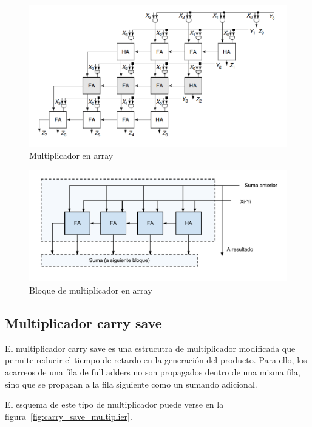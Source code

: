 \documentclass[a4paper,12pt]{article}
\begin{document}
\begin{figure}[hbt]
\includegraphics[width=\textwidth]{img/array_multiplier.png} 
\caption{Multiplicador en array} \label{fig:array_multiplier}
\end{figure}

\begin{figure}[hbt]
\includegraphics[width=\textwidth]{img/array_mult_block.pdf} 
\caption{Bloque de multiplicador en array} \label{fig:array_multiplier_block}
\end{figure}

\subsection{Multiplicador carry save}
El multiplicador carry save es una estrucutra de multiplicador modificada que permite reducir el tiempo de retardo en la generación del producto. Para ello, los acarreos de una fila de full adders no son propagados dentro de una misma fila, sino que se propagan a la fila siguiente como un sumando adicional.

El esquema de este tipo de multiplicador puede verse en la figura~\ref{fig:carry_save_multiplier}.
\end{document}

